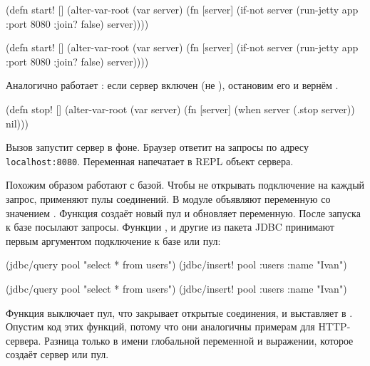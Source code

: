 \ifnarrow

\begin{clojure}
(defn start! []
  (alter-var-root
   (var server)
   (fn [server]
     (if-not server
       (run-jetty app {:port 8080
                       :join? false})
       server))))
\end{clojure}

\else

\begin{clojure}
(defn start! []
  (alter-var-root (var server)
    (fn [server]
      (if-not server
        (run-jetty app {:port 8080 :join? false})
        server))))
\end{clojure}

\fi

\noindent
Аналогично работает : если сервер включен (не ),
остановим его и вернём .

\begin{clojure}
(defn stop! []
  (alter-var-root
    (var server)
    (fn [server]
      (when server
        (.stop server))
      nil)))
\end{clojure}

Вызов  запустит сервер в фоне. Браузер ответит на запросы по
адресу \texttt{localhost\-:8080}. Переменная  напечатает в REPL
объект сервера.


Похожим образом работают с базой. Чтобы не открывать подключение на каждый
запрос, применяют пулы соединений. В модуле объявляют переменную  со
значением . Функция  создаёт новый пул и обновляет
переменную. После запуска к базе посылают запросы. Функции ,
 и другие из пакета JDBC принимают первым аргументом подключение к
базе или пул:

\ifnarrow

\begin{clojure}
(jdbc/query pool "select * from users")
(jdbc/insert! pool
  :users {:name "Ivan"})
\end{clojure}

\else

\begin{clojure}
(jdbc/query pool "select * from users")
(jdbc/insert! pool :users {:name "Ivan"})
\end{clojure}

\fi

Функция  выключает пул, что закрывает открытые соединения, и
выставляет  в . Опустим код этих функций, потому что они
аналогичны примерам для HTTP-сервера. Разница только в имени глобальной
переменной и выражении, которое создаёт сервер или пул.


